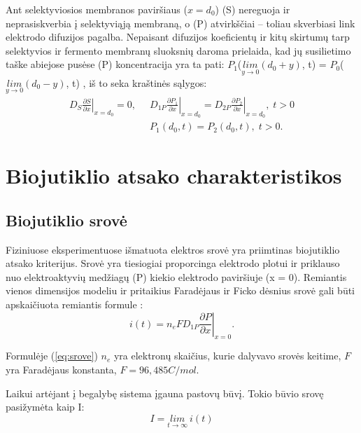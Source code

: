 \documentclass[12pt, a4paper, lithuanian]{article}
\begin{document}
Ant selektyviosios membranos paviršiaus ($x = d_0$) (S) nereguoja ir neprasiskverbia į
selektyviąją membraną, o (P) atvirkščiai – toliau skverbiasi link elektrodo
difuzijos pagalba. Nepaisant difuzijos koeficientų ir kitų skirtumų tarp selektyvios ir
fermento membranų sluoksnių daroma prielaida, kad jų susilietimo taške abiejose
pusėse (P) koncentracija yra ta pati: $P_1$($\underset{y \to 0}{lim}(d_0 + y)$, t) =
$P_0$($\underset{y \to 0}{lim}(d_0 - y)$, t)  , iš to seka kraštinės sąlygos:
\begin{equation} 
\begin{aligned}
    \left. D_S \frac{\partial S}{\partial x} \right|_{x=d_0} = 0, \;\;
    & \left. D_{1P} \frac{\partial P_1}{\partial x} \right|_{x=d_0} = 
    \left. D_{2P} \frac{\partial P_2}{\partial x} \right|_{x=d_0},\; t > 0 \\
    & P_1(d_0, t) = P_2(d_0, t),\; t>0.
\end{aligned}
\end{equation}

\section{Biojutiklio atsako charakteristikos}
\subsection{Biojutiklio srovė}

Fiziniuose eksperimentuose išmatuota elektros srovė yra priimtinas
biojutiklio atsako kriterijus. Srovė yra tiesiogiai proporcinga elektrodo
plotui ir priklauso nuo elektroaktyvių medžiagų (P)
kiekio elektrodo paviršiuje (x = 0). Remiantis vienos dimensijos modeliu
ir pritaikius Faradėjaus ir Ficko dėsnius srovė gali būti apskaičiuota
remiantis formule \cite{baronas2009mathematical}:
\begin{equation}
    \label{eq:srove}
    \left. i(t) = n_eFD_{1P}\frac{\partial P}{\partial x} \right|_{x=0}.
\end{equation}

Formulėje (\ref{eq:srove}) $n_e$ yra elektronų skaičius, kurie dalyvavo srovės
keitime, $F$ yra Faradėjaus konstanta, $F = 96,485 C/mol$.

Laikui artėjant į begalybę sistema įgauna pastovų būvį. Tokio būvio srovę
pasižymėta kaip I:
\begin{equation}
    I = \underset{t \to \infty}{lim} \ i(t)
\end{equation}
\end{document}

